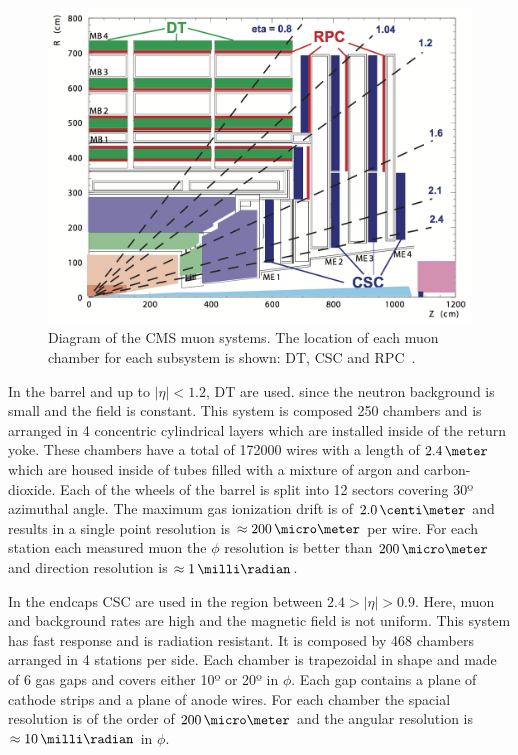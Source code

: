 \begin{figure}[!htb]
  \centering
  \includegraphics{Chapter02/CMS/Images/CMS_Muon_Layout.png}
  \caption{Diagram of the \gls{CMS} muon systems. The location of each muon chamber for each subsystem is shown: \gls{DT}, \gls{CSC} and \gls{RPC}~\cite{CMSTDR:CMSPhysicsVol1}.}
  \label{FIGURE:ExperimentalApparatus_CMS_Muon_Layout}
\end{figure}

In the barrel and up to $|\eta|<1.2$, \gls{DT} are used. since the neutron background is small and the field is constant. This system is composed 250 chambers and is arranged in 4 concentric cylindrical layers which are installed inside of the return yoke. These chambers have a total of 172000 wires with a length of $2.4\,\meter$ which are housed inside of tubes filled with a mixture of argon and carbon-dioxide. Each of the wheels of the barrel is split into 12 sectors covering 30º azimuthal angle. The maximum gas ionization drift is of $2.0\,\centi\meter$ and results in a single point resolution is $\approx 200\,\micro\meter$ per wire. For each station each measured muon the $\phi$ resolution is better than $200\,\micro\meter$ and direction resolution is $\approx 1\,\milli\radian$.

In the endcaps \gls{CSC} are used in the region between $2.4>|\eta|>0.9$. Here, muon and background rates are high and the magnetic field is not uniform. This system has fast response and is radiation resistant. It is composed by 468 chambers arranged in 4 stations per side. Each chamber is trapezoidal in shape and made of 6 gas gaps and covers either 10º or 20º in $\phi$. Each gap contains a plane of cathode strips and a plane of anode wires. For each chamber the spacial resolution is of the order of $200\,\micro\meter$ and the angular resolution is $\approx 10\,\milli\radian$ in $\phi$.

